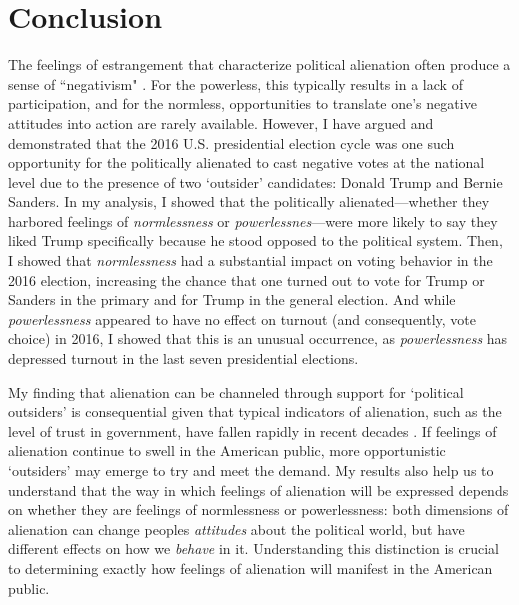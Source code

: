 \documentclass[12pt]{article}
\begin{document}

\section{Conclusion}\label{sec:conclusion}
The feelings of estrangement that characterize political alienation often produce a sense of ``negativism" \parencite{horton1962powerlessness}. For the powerless, this typically results in a lack of participation, and for the normless, opportunities to translate one's negative attitudes into action are rarely available. However, I have argued and demonstrated that the 2016 U.S. presidential election cycle was one such opportunity for the politically alienated to cast negative votes at the national level due to the presence of two `outsider' candidates: Donald Trump and Bernie Sanders. In my analysis, I showed that the politically alienated---whether they harbored feelings of \textit{normlessness} or \textit{powerlessnes}---were more likely to say they liked Trump specifically because he stood opposed to the political system. Then, I showed that \textit{normlessness} had a substantial impact on voting behavior in the 2016 election, increasing the chance that one turned out to vote for Trump or Sanders in the primary and for Trump in the general election. And while \textit{powerlessness} appeared to have no effect on turnout (and consequently, vote choice) in 2016, I showed that this is an unusual occurrence, as \textit{powerlessness} has depressed turnout in the last seven presidential elections. 

My finding that alienation can be channeled through support for `political outsiders' is consequential given that typical indicators of alienation, such as the level of trust in government, have fallen rapidly in recent decades \parencite{Citrin2018}. If feelings of alienation continue to swell in the American public, more opportunistic `outsiders' may emerge to try and meet the demand. My results also help us to understand that the way in which feelings of alienation will be expressed depends on whether they are feelings of normlessness or powerlessness: both dimensions of alienation can change peoples \textit{attitudes} about the political world, but have different effects on how we \textit{behave} in it. Understanding this distinction is crucial to determining exactly how feelings of alienation will manifest in the American public. 
\end{document}
